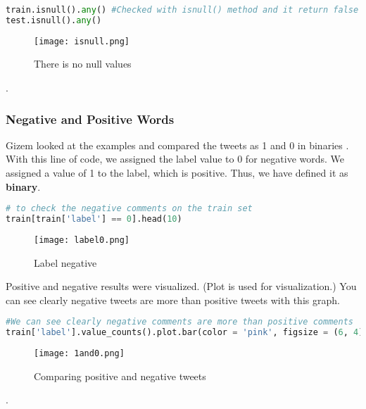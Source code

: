 \documentclass[onecolumn]{article}
\begin{document}
\begin{lstlisting}[language=Python, caption= isnull]
train.isnull().any() #Checked with isnull() method and it return false
test.isnull().any()
\end{lstlisting}

\begin{figure}[ht!]
\centering
\texttt{[image: isnull.png]}
\caption{There is no null values \label{}}
\end{figure}
.\\
\subsubsection{Negative and Positive Words}

Gizem looked at the examples and compared the tweets as 1 and 0 in binaries . With this line of code, we assigned the label value to 0 for negative words. We assigned a value of 1 to the label, which is positive. Thus, we have defined it as \textbf{binary}.

\begin{lstlisting}[language=Python, caption= label 0]
# to check the negative comments on the train set
train[train['label'] == 0].head(10)
\end{lstlisting}



\begin{figure}[ht!]
\centering
\texttt{[image: label0.png]}
\caption{Label negative\label{}}
\end{figure}

Positive and negative results were visualized. (Plot is used for visualization.)
You can see clearly negative tweets are more than positive tweets with this graph.

\begin{lstlisting}[language=Python, caption=  0 and 1]
#We can see clearly negative comments are more than positive comments
train['label'].value_counts().plot.bar(color = 'pink', figsize = (6, 4)) 
\end{lstlisting}

\begin{figure}[ht!]
\centering
\texttt{[image: 1and0.png]}
\caption{ Comparing positive and negative tweets \label{}}
\end{figure}
.\\\\\\\\\\\\\\\\\
\end{document}

